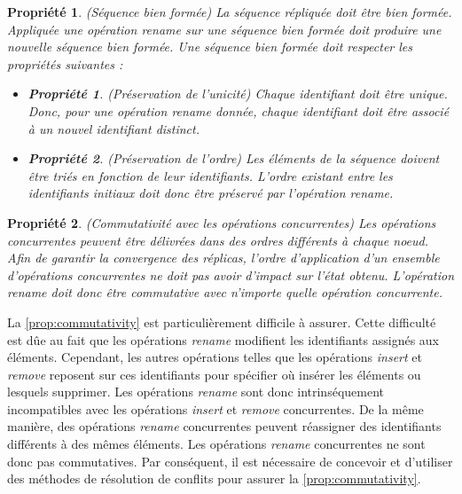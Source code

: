 \documentclass[12pt]{thesul}
\newtheorem{property}{Propriété}
\newtheorem{subproperty}{Propriété}[property]
\begin{document}
\begin{property}(Séquence bien formée)
  La séquence répliquée doit être bien formée.
  Appliquée une opération \emph{rename} sur une séquence bien formée doit produire une nouvelle séquence bien formée.
  Une séquence bien formée doit respecter les propriétés suivantes :
  \begin{itemize}[noitemsep]
    \item[~]
    \begin{subproperty}(Préservation de l'unicité)
      Chaque identifiant doit être unique.
      Donc, pour une opération \emph{rename} donnée, chaque identifiant doit être associé à un nouvel identifiant distinct.
    \end{subproperty}
    \item[~]
    \begin{subproperty}(Préservation de l'ordre)
      Les éléments de la séquence doivent être triés en fonction de leur identifiants.
      L'ordre existant entre les identifiants initiaux doit donc être préservé par l'opération \emph{rename}.
    \end{subproperty}
  \end{itemize}
\end{property}

\begin{property}(Commutativité avec les opérations concurrentes)
  \label{prop:commutativity}
  Les opérations concurrentes peuvent être délivrées dans des ordres différents à chaque noeud.
  Afin de garantir la convergence des réplicas, l'ordre d'application d'un ensemble d'opérations concurrentes ne doit pas avoir d'impact sur l'état obtenu.
  L'opération \emph{rename} doit donc être commutative avec n'importe quelle opération concurrente.
\end{property}

La \autoref{prop:commutativity} est particulièrement difficile à assurer.
Cette difficulté est dûe au fait que les opérations \emph{rename} modifient les identifiants assignés aux éléments.
Cependant, les autres opérations telles que les opérations \emph{insert} et \emph{remove} reposent sur ces identifiants pour spécifier où insérer les éléments ou lesquels supprimer.
Les opérations \emph{rename} sont donc intrinséquement incompatibles avec les opérations \emph{insert} et \emph{remove} concurrentes.
De la même manière, des opérations \emph{rename} concurrentes peuvent réassigner des identifiants différents à des mêmes éléments.
Les opérations \emph{rename} concurrentes ne sont donc pas commutatives.
Par conséquent, il est nécessaire de concevoir et d'utiliser des méthodes de résolution de conflits pour assurer la \autoref{prop:commutativity}.
\end{document}
